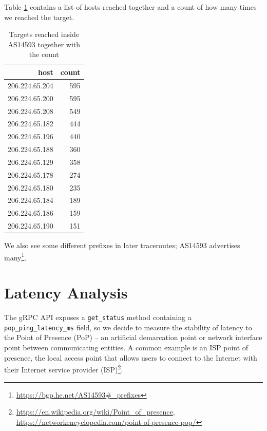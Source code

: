 \documentclass[IN,11pt,twoside,openright,idp,english]{tumthesis}
\begin{document}
Table \ref{tab:hops} contains a list of hosts reached together and a count of how many times we reached the target.
    
\begin{table}
    \label{tab:hops}
    \centering
    \begin{tabular}{ r r }
        \toprule
            host           & count \\ 
            \midrule
            206.224.65.204 & 595   \\
            206.224.65.200 & 595   \\
            206.224.65.208 & 549   \\ 
            206.224.65.182 & 444   \\
            206.224.65.196 & 440   \\ 
            206.224.65.188 & 360   \\ 
            206.224.65.129 & 358   \\ 
            206.224.65.178 & 274   \\ 
            206.224.65.180 & 235   \\ 
            206.224.65.184 & 189   \\ 
            206.224.65.186 & 159   \\ 
            206.224.65.190 & 151   \\
            \bottomrule
    \end{tabular}
    \caption{Targets reached inside AS14593 together with the count}
\end{table}

We also see some different prefixes in later traceroutes; AS14593 advertises
many\footnote{\url{https://bgp.he.net/AS14593\#_prefixes}}.
    
\section{Latency Analysis}

The gRPC API exposes a \texttt{get\_status} method containing a \texttt{pop\_ping\_latency\_ms} field, so we decide to
measure the stability of latency to the Point of Presence (PoP) -- an artificial demarcation point or network interface
point between communicating entities. A common example is an ISP point of presence, the local access point that allows
users to connect to the Internet with their Internet service provider
(ISP)\footnote{\url{https://en.wikipedia.org/wiki/Point_of_presence},
\url{https://networkencyclopedia.com/point-of-presence-pop/}}.
\end{document}
